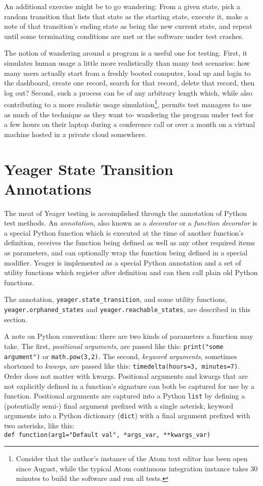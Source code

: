 An additional exercise might be to go wandering: From a given state, pick a random transition that lists that state as the starting state, execute it, make a note of that transition's ending state as being the new current state, and repeat until some terminating conditions are met or the software under test crashes.

The notion of wandering around a program is a useful one for testing. First, it simulates human usage a little more realistically than many test scenarios: how many users actually start from a freshly booted computer, load up and login to the dashboard, create one record, search for that record, delete that record, then log out? Second, such a process can be of any arbitrary length which, while also contributing to a more realistic usage simulation\footnote{Consider that the author's instance of the Atom text editor has been open since August, while the typical Atom continuous integration instance takes 30 minutes to build the software and run all tests.\citep{CircleCI}}, permits test managers to use as much of the technique as they want to- wandering the program under test for a few hours on their laptop during a conference call or over a month on a virtual machine hosted in a private cloud somewhere.

\section{Yeager State Transition Annotations}
The meat of Yeager testing is accomplished through the annotation of Python test methods. An \textit{annotation}, also known as a \textit{decorator} or a \textit{function decorator} is a special Python function which is executed at the time of another function's definition, receives the function being defined as well as any other required items as parameters, and can optionally wrap the function being defined in a special modifier. Yeager is implemented as a special Python annotation and a set of utility functions which register after definition and can then call plain old Python functions.

The annotation, \texttt{yeager.state\_transition}, and some utility functions, \\\texttt{yeager.orphaned\_states} and \texttt{yeager.reachable\_states}, are described in this section.

A note on Python convention: there are two kinds of parameters a function may take. The first, \textit{positional arguments}, are passed like this: \texttt{print("some argument")} or \texttt{math.pow(3,2)}. The second, \textit{keyword arguments}, sometimes shortened to \textit{kwargs}, are passed like this:
\texttt{timedelta(hours=3, minutes=7)}. Order does not matter with kwargs. Positional arguments and kwargs that are not explicitly defined in a function's signature can both be captured for use by a function. Positional arguments are captured into a Python \texttt{list} by defining a (potentially semi-) final argument prefixed with a single asterisk, keyword arguments into a Python dictionary (\texttt{dict}) with a final argument prefixed with two asterisks, like this:
\\\texttt{def function(arg1="Default val", *args\_var, **kwargs\_var)}

